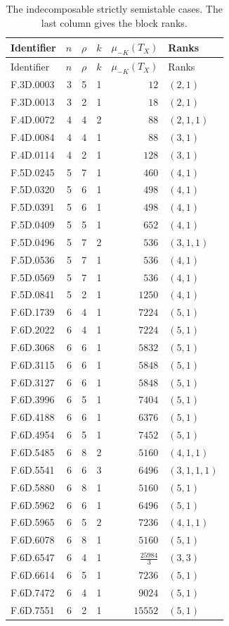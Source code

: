\begin{longtable}{lrrrrl}
\caption{The indecomposable strictly semistable cases. The last column gives the block ranks.}\label{tab:records}\\
\toprule Identifier & $n$ & $\rho$ & $k$ & $\mu_{-K}(T_X)$ & Ranks\\\midrule\endfirsthead
\toprule Identifier & $n$ & $\rho$ & $k$ & $\mu_{-K}(T_X)$ & Ranks\\\midrule\endhead
\bottomrule\endfoot
F.3D.0003 & 3 & 5 & 1 & $12$ & $(2,1)$\\
F.3D.0013 & 3 & 2 & 1 & $18$ & $(2,1)$\\
F.4D.0072 & 4 & 4 & 2 & $88$ & $(2,1,1)$\\
F.4D.0084 & 4 & 4 & 1 & $88$ & $(3,1)$\\
F.4D.0114 & 4 & 2 & 1 & $128$ & $(3,1)$\\
F.5D.0245 & 5 & 7 & 1 & $460$ & $(4,1)$\\
F.5D.0320 & 5 & 6 & 1 & $498$ & $(4,1)$\\
F.5D.0391 & 5 & 6 & 1 & $498$ & $(4,1)$\\
F.5D.0409 & 5 & 5 & 1 & $652$ & $(4,1)$\\
F.5D.0496 & 5 & 7 & 2 & $536$ & $(3,1,1)$\\
F.5D.0536 & 5 & 7 & 1 & $536$ & $(4,1)$\\
F.5D.0569 & 5 & 7 & 1 & $536$ & $(4,1)$\\
F.5D.0841 & 5 & 2 & 1 & $1250$ & $(4,1)$\\
F.6D.1739 & 6 & 4 & 1 & $7224$ & $(5,1)$\\
F.6D.2022 & 6 & 4 & 1 & $7224$ & $(5,1)$\\
F.6D.3068 & 6 & 6 & 1 & $5832$ & $(5,1)$\\
F.6D.3115 & 6 & 6 & 1 & $5848$ & $(5,1)$\\
F.6D.3127 & 6 & 6 & 1 & $5848$ & $(5,1)$\\
F.6D.3996 & 6 & 5 & 1 & $7404$ & $(5,1)$\\
F.6D.4188 & 6 & 6 & 1 & $6376$ & $(5,1)$\\
F.6D.4954 & 6 & 5 & 1 & $7452$ & $(5,1)$\\
F.6D.5485 & 6 & 8 & 2 & $5160$ & $(4,1,1)$\\
F.6D.5541 & 6 & 6 & 3 & $6496$ & $(3,1,1,1)$\\
F.6D.5880 & 6 & 8 & 1 & $5160$ & $(5,1)$\\
F.6D.5962 & 6 & 6 & 1 & $6496$ & $(5,1)$\\
F.6D.5965 & 6 & 5 & 2 & $7236$ & $(4,1,1)$\\
F.6D.6078 & 6 & 8 & 1 & $5160$ & $(5,1)$\\
F.6D.6547 & 6 & 4 & 1 & $\frac{25984}{3}$ & $(3,3)$\\
F.6D.6614 & 6 & 5 & 1 & $7236$ & $(5,1)$\\
F.6D.7472 & 6 & 4 & 1 & $9024$ & $(5,1)$\\
F.6D.7551 & 6 & 2 & 1 & $15552$ & $(5,1)$\\
\end{longtable}
